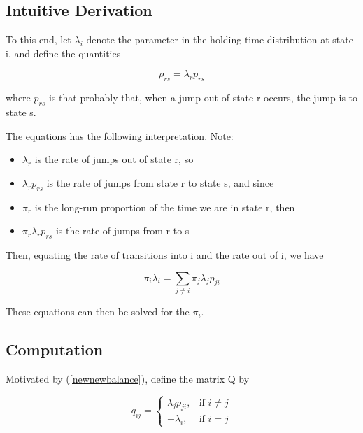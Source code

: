 \subsection{Intuitive Derivation}

To this end, let $\lambda_{i}$ denote the parameter in the
holding-time distribution at state i, and define the
quantities 

\begin{equation}
\label{rhorsxxx}
\rho_{rs} = \lambda_r p_{rs}
\end{equation}

where $p_{rs}$ is that probably that, when a jump out of state r occurs,
the jump is to state s.

The equations has the following interpretation.  Note:

\begin{itemize}

\item $\lambda_r$ is the rate of jumps out of state r, so

\item $\lambda_r p_{rs}$ is the rate of jumps from state r to state s,
and since

\item $\pi_r$ is the long-run proportion of the time we are in state r,
then

\item $\pi_r \lambda_r p_{rs}$ is the rate of jumps from r to s

\end{itemize}

Then, equating the rate of transitions into i and the rate out of i, we
have

\begin{equation}
\label{newnewbalance}
\pi_i \lambda_i = \sum_{j \neq i} \pi_j \lambda_j p_{ji}
\end{equation}

These equations can then be solved for the $\pi_i$.

\subsection{Computation}

Motivated by (\ref{newnewbalance}), define the matrix Q by

\begin{equation}
q_{ij} = 
\begin{cases}
\lambda_j p_{ji}, & \text{if $i \neq j$}\\
-\lambda_i, & \text{if $i = j$}
\end{cases}
\end{equation}

